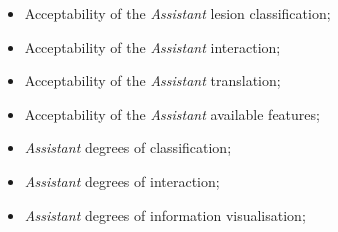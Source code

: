 
\hfill

\begin{itemize}
\item Acceptability of the \textit{Assistant} lesion classification;
\item Acceptability of the \textit{Assistant} interaction;
\item Acceptability of the \textit{Assistant} translation;
\item Acceptability of the \textit{Assistant} available features;
\item \textit{Assistant} degrees of classification;
\item \textit{Assistant} degrees of interaction;
\item \textit{Assistant} degrees of information visualisation;
\end{itemize}

\hfill


